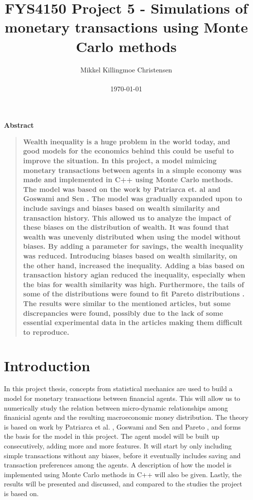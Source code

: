 \documentclass[11pt,a4paper,titlepage]{article}
\title{FYS4150 Project 5 - Simulations of monetary transactions using Monte Carlo methods}
\author
{Mikkel Killingmoe Christensen\\
\\
\normalsize{\today}
}
\date{}
\newenvironment{sciabstract}{%
\begin{quote} \bf}
{\end{quote}}
\begin{document}
 


\maketitle 





\begin{center}
{\large \textbf{Abstract}}
\end{center}
\begin{sciabstract}
Wealth inequality is a huge problem in the world today, and good models  for the economics behind this could be useful to improve the situation. In this project, a model mimicing monetary transactions between agents in a simple economy was made and implemented in C++ using Monte Carlo methods. The model was based on the work by Patriarca et. al \cite{Patriarca} and Goswami and Sen \cite{Goswami}. The model was gradually expanded upon to include savings and biases based on wealth similarity and transaction history. This allowed us to analyze the impact of these biases on the distribution of wealth. It was found that wealth was unevenly distributed when using the model without biases. By adding a parameter for savings, the wealth inequality was reduced. Introducing biases based on wealth similarity, on the other hand, increased the inequality.  Adding a bias based on transaction history agian reduced the inequality, especially when the bias for wealth similarity was high. Furthermore, the tails of some of the distributions were found to fit Pareto distributions \cite{Pareto}. The results were similar to the mentioned articles, but some discrepancies were found, possibly due to the lack of some essential experimental data in the articles making them difficult to reproduce.  
\end{sciabstract}

\tableofcontents
\clearpage


\section{Introduction}
In this project thesis, concepts from statistical mechanics are used to build a model for monetary transactions between financial agents. This will allow us to numerically study the relation between micro-dynamic relationships among finanicial agents and the resulting macroeconomic money distribution. The theory is based on work by Patriarca et al. \cite{Patriarca}, Goswami and Sen \cite{Goswami} and Pareto \cite{Pareto}, and forms the basis for the model in this project. The agent model will be built up consecutively, adding more and more features. It will start by only including simple transactions without any biases, before it eventually includes saving and transaction preferences among the agents. A description of how the model is implemented using Monte Carlo methods in C++ will also be given. Lastly, the results will be presented and discussed, and compared to the studies the project is based on. 
\end{document}
